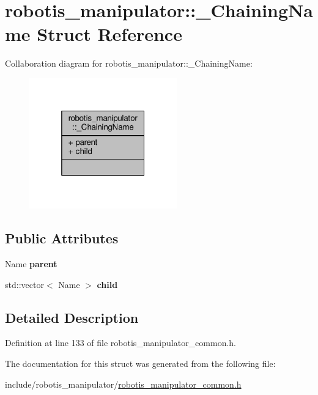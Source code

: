\hypertarget{structrobotis__manipulator_1_1___chaining_name}{}\section{robotis\+\_\+manipulator\+:\+:\+\_\+\+Chaining\+Name Struct Reference}
\label{structrobotis__manipulator_1_1___chaining_name}


Collaboration diagram for robotis\+\_\+manipulator\+:\+:\+\_\+\+Chaining\+Name\+:
\nopagebreak
\begin{figure}[H]
\begin{center}
\leavevmode
\includegraphics[width=181pt]{structrobotis__manipulator_1_1___chaining_name__coll__graph}
\end{center}
\end{figure}
\subsection*{Public Attributes}
\begin{DoxyCompactItemize}
\item 
Name {\bfseries parent}\hypertarget{structrobotis__manipulator_1_1___chaining_name_af13162de0c8f795608bd4480c52b7deb}{}\label{structrobotis__manipulator_1_1___chaining_name_af13162de0c8f795608bd4480c52b7deb}

\item 
std\+::vector$<$ Name $>$ {\bfseries child}\hypertarget{structrobotis__manipulator_1_1___chaining_name_ac1ed6237126b45ed4c028368d76a67d1}{}\label{structrobotis__manipulator_1_1___chaining_name_ac1ed6237126b45ed4c028368d76a67d1}

\end{DoxyCompactItemize}


\subsection{Detailed Description}


Definition at line 133 of file robotis\+\_\+manipulator\+\_\+common.\+h.



The documentation for this struct was generated from the following file\+:\begin{DoxyCompactItemize}
\item 
include/robotis\+\_\+manipulator/\hyperlink{robotis__manipulator__common_8h}{robotis\+\_\+manipulator\+\_\+common.\+h}\end{DoxyCompactItemize}
